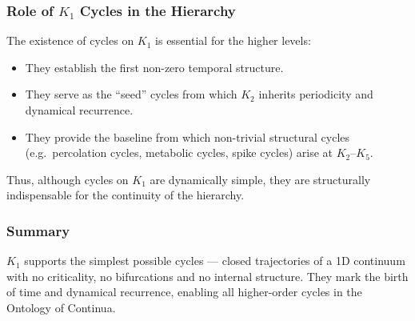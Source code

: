 \subsubsection{Role of \texorpdfstring{$K_1$}{K_1} Cycles in the Hierarchy}

The existence of cycles on $K_1$ is essential for the higher levels:

\begin{itemize}
  \item They establish the first non-zero temporal structure.
  \item They serve as the ``seed'' cycles from which $K_2$
        inherits periodicity and dynamical recurrence.
  \item They provide the baseline from which non-trivial structural
        cycles (e.g.\ percolation cycles, metabolic cycles, spike
        cycles) arise at $K_2$–$K_5$.
\end{itemize}

Thus, although cycles on $K_1$ are dynamically simple, they are
structurally indispensable for the continuity of the hierarchy.

\subsubsection{Summary}

$K_1$ supports the simplest possible cycles — closed trajectories of a
1D continuum with no criticality, no bifurcations and no internal
structure.  
They mark the birth of time and dynamical recurrence, enabling all
higher-order cycles in the Ontology of Continua.
